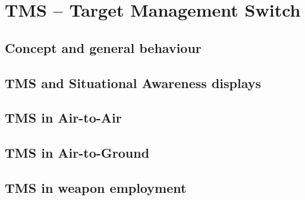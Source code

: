 \documentclass[11pt, a4paper, twoside]{report}
\begin{document}
\chapter{TMS -- Target Management Switch}
\label{chap:C4}

\section{Concept and general behaviour}
\label{sec:C4-S1}

\section{TMS and Situational Awareness displays}
\label{sec:C4-S2}

\section{TMS in Air-to-Air}
\label{sec:C4-S3}

\section{TMS in Air-to-Ground}
\label{sec:C4-S4}

\section{TMS in weapon employment}
\label{sec:C4-S5}

\end{document}
